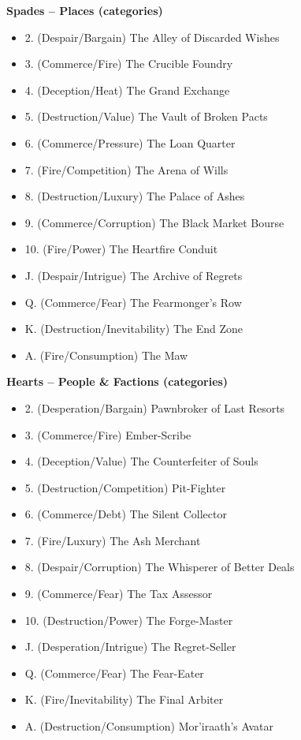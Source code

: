 \documentclass[11pt,letterpaper]{article}
\newcommand{\patronbox}[1]{\noindent\textbf{#1}\\}
\begin{document}
\patronbox{Spades -- Places (categories)}
\begin{multicols}{2}
\begin{itemize}[leftmargin=*]
    \item 2. (Despair/Bargain) The Alley of Discarded Wishes
    \item 3. (Commerce/Fire) The Crucible Foundry
    \item 4. (Deception/Heat) The Grand Exchange
    \item 5. (Destruction/Value) The Vault of Broken Pacts
    \item 6. (Commerce/Pressure) The Loan Quarter
    \item 7. (Fire/Competition) The Arena of Wills
    \item 8. (Destruction/Luxury) The Palace of Ashes
    \item 9. (Commerce/Corruption) The Black Market Bourse
    \item 10. (Fire/Power) The Heartfire Conduit
    \item J. (Despair/Intrigue) The Archive of Regrets
    \item Q. (Commerce/Fear) The Fearmonger's Row
    \item K. (Destruction/Inevitability) The End Zone
    \item A. (Fire/Consumption) The Maw
\end{itemize}
\end{multicols}

\patronbox{Hearts -- People \& Factions (categories)}
\begin{multicols}{2}
\begin{itemize}[leftmargin=*]
    \item 2. (Desperation/Bargain) Pawnbroker of Last Resorts
    \item 3. (Commerce/Fire) Ember-Scribe
    \item 4. (Deception/Value) The Counterfeiter of Souls
    \item 5. (Destruction/Competition) Pit-Fighter
    \item 6. (Commerce/Debt) The Silent Collector
    \item 7. (Fire/Luxury) The Ash Merchant
    \item 8. (Despair/Corruption) The Whisperer of Better Deals
    \item 9. (Commerce/Fear) The Tax Assessor
    \item 10. (Destruction/Power) The Forge-Master
    \item J. (Desperation/Intrigue) The Regret-Seller
    \item Q. (Commerce/Fear) The Fear-Eater
    \item K. (Fire/Inevitability) The Final Arbiter
    \item A. (Destruction/Consumption) Mor'iraath's Avatar
\end{itemize}
\end{multicols}
\end{document}
